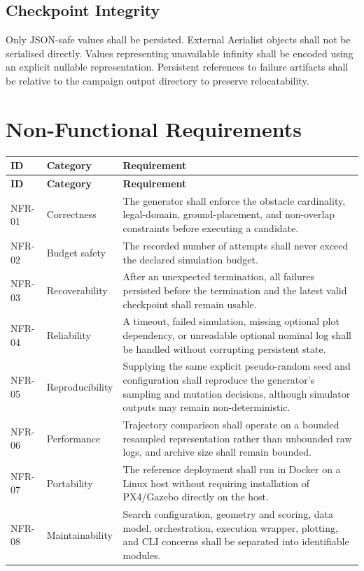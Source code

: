 \documentclass[11pt,a4paper]{report}
\begin{document}
\subsection{Checkpoint Integrity}
Only JSON-safe values shall be persisted. External Aerialist objects shall not be serialised directly. Values representing unavailable infinity shall be encoded using an explicit nullable representation. Persistent references to failure artifacts shall be relative to the campaign output directory to preserve relocatability.

\section{Non-Functional Requirements}
\begin{longtable}{L{1.7cm} L{2.4cm} L{10.5cm}}
\toprule
\textbf{ID} & \textbf{Category} & \textbf{Requirement}\\
\midrule
\endfirsthead
\toprule
\textbf{ID} & \textbf{Category} & \textbf{Requirement}\\
\midrule
\endhead
NFR-01 & Correctness & The generator shall enforce the obstacle cardinality, legal-domain, ground-placement, and non-overlap constraints before executing a candidate.\\
NFR-02 & Budget safety & The recorded number of attempts shall never exceed the declared simulation budget.\\
NFR-03 & Recoverability & After an unexpected termination, all failures persisted before the termination and the latest valid checkpoint shall remain usable.\\
NFR-04 & Reliability & A timeout, failed simulation, missing optional plot dependency, or unreadable optional nominal log shall be handled without corrupting persistent state.\\
NFR-05 & Reproducibility & Supplying the same explicit pseudo-random seed and configuration shall reproduce the generator's sampling and mutation decisions, although simulator outputs may remain non-deterministic.\\
NFR-06 & Performance & Trajectory comparison shall operate on a bounded resampled representation rather than unbounded raw logs, and archive size shall remain bounded.\\
NFR-07 & Portability & The reference deployment shall run in Docker on a Linux host without requiring installation of PX4/Gazebo directly on the host.\\
NFR-08 & Maintainability & Search configuration, geometry and scoring, data model, orchestration, execution wrapper, plotting, and CLI concerns shall be separated into identifiable modules.\\

\end{longtable}
\end{document}
